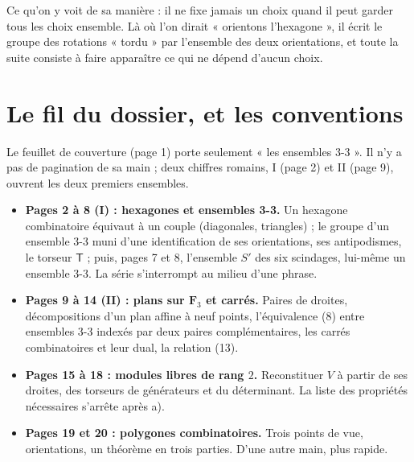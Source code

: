 \documentclass[11pt,a4paper]{article}
\begin{document}
\begin{resume}
Ce qu'on y voit de sa manière : il ne fixe jamais un choix quand il peut garder
tous les choix ensemble. Là où l'on dirait « orientons l'hexagone », il écrit
le groupe des rotations « tordu » par l'ensemble des deux orientations, et
toute la suite consiste à faire apparaître ce qui ne dépend d'aucun choix.

\end{resume}

\section*{Le fil du dossier, et les conventions}

Le feuillet de couverture (page 1) porte seulement « les ensembles 3-3 ». Il n'y
a pas de pagination de sa main ; deux chiffres romains, I (page 2) et II
(page 9), ouvrent les deux premiers ensembles.

\begin{itemize}
  \item \textbf{Pages 2 à 8 (I) : hexagones et ensembles 3-3.} Un hexagone
    combinatoire équivaut à un couple (diagonales, triangles) ; le groupe
    d'un ensemble 3-3 muni d'une identification de ses orientations, ses
    antipodismes, le torseur $\mathsf{T}$ ; puis, pages 7 et 8, l'ensemble $S'$ des
    six scindages, lui-même un ensemble 3-3. La série s'interrompt au milieu
    d'une phrase.
  \item \textbf{Pages 9 à 14 (II) : plans sur $\mathbf{F}_3$ et carrés.} Paires de
    droites, décompositions d'un plan affine à neuf points, l'équivalence (8)
    entre ensembles 3-3 indexés par deux paires complémentaires, les carrés
    combinatoires et leur dual, la relation (13).
  \item \textbf{Pages 15 à 18 : modules libres de rang $2$.} Reconstituer $V$ à
    partir de ses droites, des torseurs de générateurs et du déterminant. La
    liste des propriétés nécessaires s'arrête après a).
  \item \textbf{Pages 19 et 20 : polygones combinatoires.} Trois points de vue,
    orientations, un théorème en trois parties. D'une autre main, plus rapide.
\end{itemize}
\end{document}
